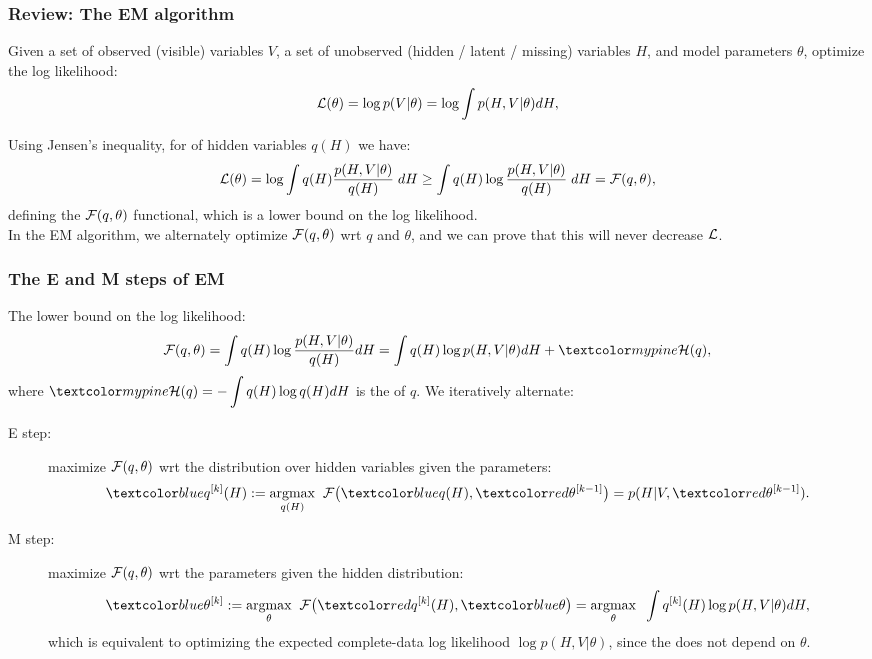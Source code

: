 \begin{frame}
\frametitle{Review: The EM algorithm}

Given a set of observed (visible) variables $V$, a set of unobserved
(hidden / latent / missing) variables $H$, and model parameters
$\theta$, optimize the log likelihood:  
%
\begin{equation*}
{\cal L}(\theta)=\log p(V|\theta)=\log \int p(H,V|\theta)dH,
\end{equation*}

Using Jensen's inequality, for  of hidden
variables $q(H)$ we have:
%
\begin{equation*}
{\cal L}(\theta)=\log\int q(H)\frac{p(H,V|\theta)}{q(H)}\; dH
\geq\int q(H)\log\frac{p(H,V|\theta)}{q(H)} \; dH={\cal F}(q,\theta),
\end{equation*}
%
defining the ${\cal F}(q,\theta)$ functional, which is a lower bound
on the log likelihood.\\

In the EM algorithm, we alternately optimize ${\cal F}(q,\theta)$ wrt
$q$ and $\theta$, and we can prove that this will never decrease
${\cal L}$.


\end{frame}
\begin{frame}
\frametitle{The E and M steps of EM}

The lower bound on the log likelihood:
%
\begin{equation*}
{\cal F}(q,\theta)=\int q(H)\log\frac{p(H,V|\theta)}{q(H)}dH=
\int q(H)\log p(H,V|\theta)dH+\Green{{\cal H}(q)},
\end{equation*}
%
where $\Green{{\cal H}(q)=-\displaystyle\int q(H)\log q(H)dH}$ is the  of
$q$. We iteratively alternate:
%
\begin{description}
\item[E step:] maximize ${\cal F}(q,\theta)$ wrt the distribution over hidden
variables given the parameters:
\begin{equation*}
\Blue{q^{[k]}(H)}:=\underset{q(H)}{\argmax}\;\;{\cal F}\big(\Blue{q(H)},\Red{\theta^{[k-1]}}\big) = p(H|V,\Red{\theta^{[k-1]}}).
\end{equation*}
\item[M step:] maximize ${\cal F}(q,\theta)$ wrt the parameters given
the hidden distribution:
\begin{equation*}
\Blue{\theta^{[k]}}:=\underset{\theta}{\argmax}\;\;
{\cal F}\big(\Red{q^{[k]}(H)},\Blue{\theta}\big)=
\underset{\theta}{\argmax}\;\;\int q^{[k]}(H)\log p(H,V|\theta)dH,
\end{equation*}
which is equivalent to optimizing the expected complete-data log likelihood
$\log p(H,V|\theta)$, since the  does not depend on 
$\theta$.
\end{description}

\end{frame}
